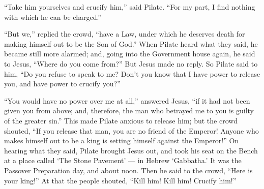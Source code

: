 ``Take him yourselves and crucify him,'' said Pilate. ``For my part, I
find nothing with which he can be charged.''

 ``But we,'' replied the crowd, ``have a Law, under which he
deserves death for making himself out to be the Son of God.''
 When Pilate heard what they said, he became still more
alarmed;  and, going into the Government house again, he
said to Jesus, ``Where do you come from?''  But Jesus made
no reply. So Pilate said to him, ``Do you refuse to speak to me? Don't
you know that I have power to release you, and have power to crucify
you?''

 ``You would have no power over me at all,'' answered
Jesus, ``if it had not been given you from above; and, therefore, the
man who betrayed me to you is guilty of the greater sin.'' 
This made Pilate anxious to release him; but the crowd shouted, ``If you
release that man, you are no friend of the Emperor! Anyone who makes
himself out to be a king is setting himself against the Emperor!''
 On hearing what they said, Pilate brought Jesus out, and
took his seat on the Bench at a place called `The Stone Pavement' --- in
Hebrew `Gabbatha.'  It was the Passover Preparation day,
and about noon. Then he said to the crowd, ``Here is your king!''
 At that the people shouted, ``Kill him! Kill him! Crucify
him!''

